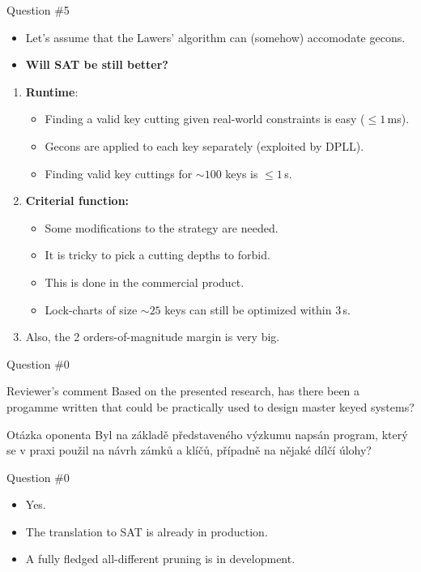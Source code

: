 \begin{frame}{Question \#5}
  \begin{itemize}
    \item Let's assume that the Lawers' algorithm can (somehow) accomodate gecons.
    \item \textbf{Will SAT be still better?}
  \end{itemize}

  \pause
  \begin{enumerate}
    \item \textbf{Runtime}:
    \begin{itemize}
      \item Finding a valid key cutting given real-world constraints is easy ($\leq 1\,$ms).
      \item Gecons are applied to each key separately (exploited by DPLL).
      \item Finding valid key cuttings for $\sim 100$ keys is $\leq 1\,$s.
    \end{itemize}
    \pause
    \item \textbf{Criterial function:}
    \begin{itemize}
      \item Some modifications to the strategy are needed.
      \item It is tricky to pick a cutting depths to forbid.
      \item This is done in the commercial product.
      \item Lock-charts of size $\sim 25$ keys can still be optimized within $3\,$s.
    \end{itemize}
    \item Also, the 2 orders-of-magnitude margin is very big.
  \end{enumerate}
\end{frame}

\begin{frame}{Question \#0}
  \begin{block}{Reviewer's comment}
    Based on the presented research,
    has there been a progamme written
    that could be practically used
    to design master keyed systems?
  \end{block}
  \begin{block}{Otázka oponenta}
    Byl na základě představeného výzkumu napsán program,
    který se v praxi použil na návrh zámků a klíčů,
    případně na nějaké dílčí úlohy?
  \end{block}
\end{frame}

\begin{frame}{Question \#0}
  \begin{itemize}
    \item Yes.
    \item The translation to SAT is already in production.
    \item A fully fledged all-different pruning is in development.
  \end{itemize}
\end{frame}

\begin{frame}
  
  
\end{frame}


